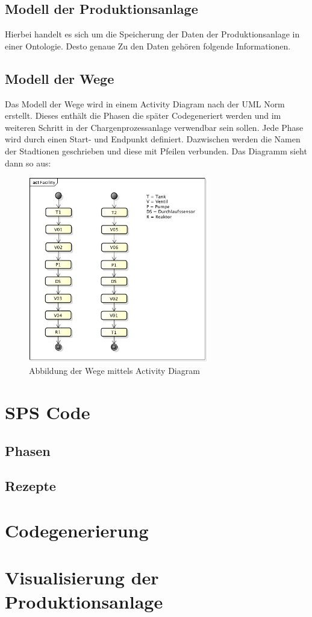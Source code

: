 \subsection{Modell der Produktionsanlage}
Hierbei handelt es sich um die Speicherung der Daten der Produktionsanlage in einer Ontologie. Desto genaue Zu den Daten gehören folgende Informationen. 

\subsection{Modell der Wege}
Das Modell der Wege wird in einem Activity Diagram nach der UML Norm erstellt. Dieses enthält die Phasen die später Codegeneriert werden und im weiteren Schritt in der Chargenprozessanlage verwendbar sein sollen.
Jede Phase wird durch einen Start- und Endpunkt definiert. Dazwischen werden die Namen der Stadtionen geschrieben und diese mit Pfeilen verbunden. Das Diagramm sieht dann so aus: 
\begin{figure}[h!]
		\centering
		\includegraphics[width=0.7\textwidth]{graphics/konzept/UML_Activity.png}
		\caption{Abbildung der Wege mittels Activity Diagram}
\end{figure}
\newpage
\section{SPS Code}
\subsection{Phasen}
\subsection{Rezepte}
\section{Codegenerierung}
\section{Visualisierung der Produktionsanlage}

